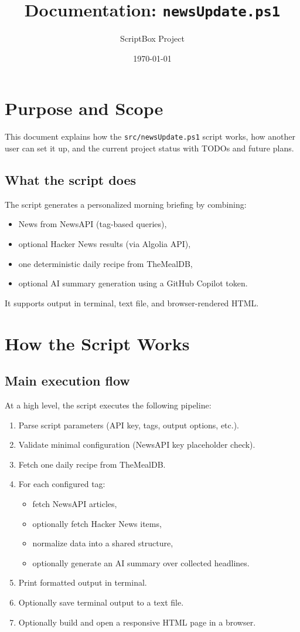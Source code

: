 \documentclass[11pt,a4paper]{article}
\title{Documentation: \texttt{newsUpdate.ps1}}
\author{ScriptBox Project}
\date{\today}
\begin{document}
\maketitle
\tableofcontents
\newpage

\section{Purpose and Scope}
This document explains how the \texttt{src/newsUpdate.ps1} script works, how another user can set it up, and the current project status with TODOs and future plans.

\subsection{What the script does}
The script generates a personalized morning briefing by combining:
\begin{itemize}
  \item News from NewsAPI (tag-based queries),
  \item optional Hacker News results (via Algolia API),
  \item one deterministic daily recipe from TheMealDB,
  \item optional AI summary generation using a GitHub Copilot token.
\end{itemize}

It supports output in terminal, text file, and browser-rendered HTML.

\section{How the Script Works}
\subsection{Main execution flow}
At a high level, the script executes the following pipeline:
\begin{enumerate}
  \item Parse script parameters (API key, tags, output options, etc.).
  \item Validate minimal configuration (NewsAPI key placeholder check).
  \item Fetch one daily recipe from TheMealDB.
  \item For each configured tag:
    \begin{itemize}
      \item fetch NewsAPI articles,
      \item optionally fetch Hacker News items,
      \item normalize data into a shared structure,
      \item optionally generate an AI summary over collected headlines.
    \end{itemize}
  \item Print formatted output in terminal.
  \item Optionally save terminal output to a text file.
  \item Optionally build and open a responsive HTML page in a browser.
\end{enumerate}
\end{document}
